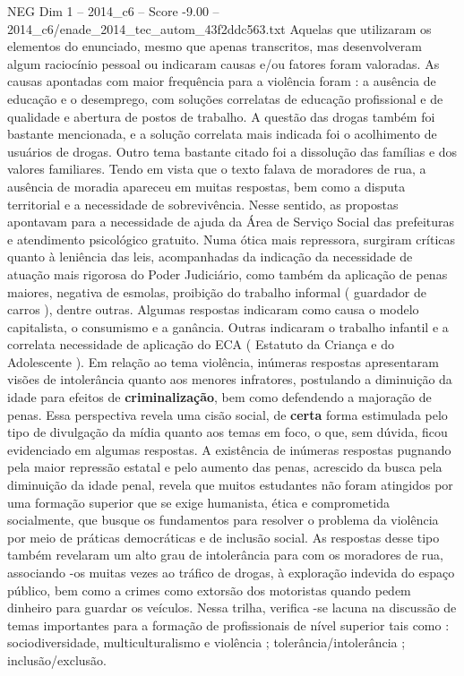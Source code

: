 \begin{textsample}{NEG Dim 1 – 2014\_c6 – Score -9.00 – 2014\_c6/enade\_2014\_tec\_autom\_43f2ddc563.txt}
Aquelas que utilizaram os elementos do enunciado, mesmo que apenas transcritos, mas desenvolveram algum raciocínio pessoal ou indicaram causas e/ou fatores foram valoradas.
As causas apontadas com maior frequência para a violência foram : a ausência de educação e o desemprego, com soluções correlatas de educação profissional e de qualidade e abertura de postos de trabalho.
A questão das drogas também foi bastante mencionada, e a solução correlata mais indicada foi o acolhimento de usuários de drogas.
Outro tema bastante citado foi a dissolução das famílias e dos valores familiares.
Tendo em vista que o texto falava de moradores de rua, a ausência de moradia apareceu em muitas respostas, bem como a disputa territorial e a necessidade de sobrevivência.
Nesse sentido, as propostas apontavam para a necessidade de ajuda da Área de Serviço Social das prefeituras e atendimento psicológico gratuito.
Numa ótica mais repressora, surgiram críticas quanto à leniência das leis, acompanhadas da indicação da necessidade de atuação mais rigorosa do Poder Judiciário, como também da aplicação de penas maiores, negativa de esmolas, proibição do trabalho informal ( guardador de carros ), dentre outras.
Algumas respostas indicaram como causa o modelo capitalista, o consumismo e a ganância.
Outras indicaram o trabalho infantil e a correlata necessidade de aplicação do ECA ( Estatuto da Criança e do Adolescente ).
Em relação ao tema violência, inúmeras respostas apresentaram visões de intolerância quanto aos menores infratores, postulando a diminuição da idade para efeitos de \textbf{criminalização}, bem como defendendo a majoração de penas.
Essa perspectiva revela uma cisão social, de \textbf{certa} forma estimulada pelo tipo de divulgação da mídia quanto aos temas em foco, o que, sem dúvida, ficou evidenciado em algumas respostas.
A existência de inúmeras respostas pugnando pela maior repressão estatal e pelo aumento das penas, acrescido da busca pela diminuição da idade penal, revela que muitos estudantes não foram atingidos por uma formação superior que se exige humanista, ética e comprometida socialmente, que busque os fundamentos para resolver o problema da violência por meio de práticas democráticas e de inclusão social.
As respostas desse tipo também revelaram um alto grau de intolerância para com os moradores de rua, associando -os muitas vezes ao tráfico de drogas, à exploração indevida do espaço público, bem como a crimes como extorsão dos motoristas quando pedem dinheiro para guardar os veículos.
Nessa trilha, verifica -se lacuna na discussão de temas importantes para a formação de profissionais de nível superior tais como : sociodiversidade, multiculturalismo e violência ; tolerância/intolerância ; inclusão/exclusão.

\end{textsample}
